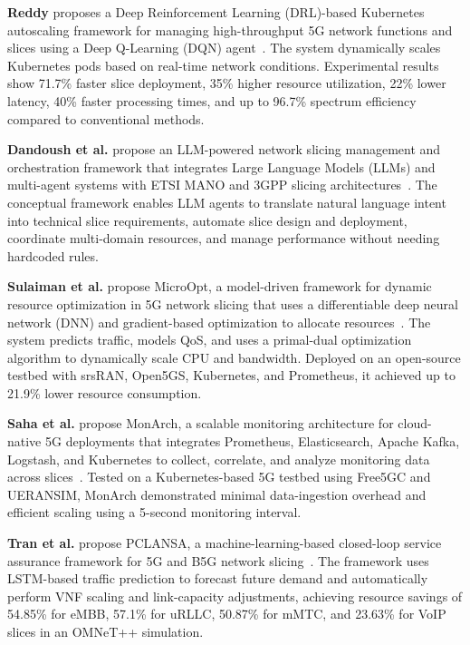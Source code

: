 \textbf{Reddy} proposes a Deep Reinforcement Learning (DRL)-based Kubernetes autoscaling framework for managing high-throughput 5G network functions and slices using a Deep Q-Learning (DQN) agent~\cite{reddy2025}. The system dynamically scales Kubernetes pods based on real-time network conditions. Experimental results show 71.7\% faster slice deployment, 35\% higher resource utilization, 22\% lower latency, 40\% faster processing times, and up to 96.7\% spectrum efficiency compared to conventional methods.

\textbf{Dandoush et al.} propose an LLM-powered network slicing management and orchestration framework that integrates Large Language Models (LLMs) and multi-agent systems with ETSI MANO and 3GPP slicing architectures~\cite{dandoush2024}. The conceptual framework enables LLM agents to translate natural language intent into technical slice requirements, automate slice design and deployment, coordinate multi-domain resources, and manage performance without needing hardcoded rules.

\textbf{Sulaiman et al.} propose MicroOpt, a model-driven framework for dynamic resource optimization in 5G network slicing that uses a differentiable deep neural network (DNN) and gradient-based optimization to allocate resources~\cite{sulaiman2024}. The system predicts traffic, models QoS, and uses a primal-dual optimization algorithm to dynamically scale CPU and bandwidth. Deployed on an open-source testbed with srsRAN, Open5GS, Kubernetes, and Prometheus, it achieved up to 21.9\% lower resource consumption.

\textbf{Saha et al.} propose MonArch, a scalable monitoring architecture for cloud-native 5G deployments that integrates Prometheus, Elasticsearch, Apache Kafka, Logstash, and Kubernetes to collect, correlate, and analyze monitoring data across slices~\cite{saha2022}. Tested on a Kubernetes-based 5G testbed using Free5GC and UERANSIM, MonArch demonstrated minimal data-ingestion overhead and efficient scaling using a 5-second monitoring interval.

\textbf{Tran et al.} propose PCLANSA, a machine-learning-based closed-loop service assurance framework for 5G and B5G network slicing~\cite{tran2025}. The framework uses LSTM-based traffic prediction to forecast future demand and automatically perform VNF scaling and link-capacity adjustments, achieving resource savings of 54.85\% for eMBB, 57.1\% for uRLLC, 50.87\% for mMTC, and 23.63\% for VoIP slices in an OMNeT++ simulation.

